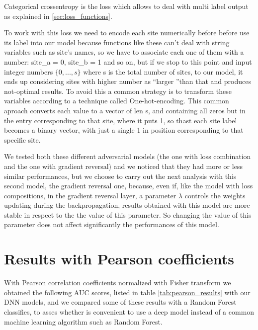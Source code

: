 \documentclass[10pt]{report}
\begin{document}
Categorical crossentropy is the loss which allows to deal with multi label output as explained in \ref{sec:loss_functions}.
\begin{notes}
\item To work with this loss we need to encode each site numerically before before use its label into our model because functions like these can't deal with string variables such as site's names, so we have to associate each one of them with a number: site\_a = 0, site\_b = 1 and so on, but if we stop to this point and input integer numbers $\{0, ..., s\}$ where s is the total number of sites, to our model, it ends up considering sites with higher number as \textquotedblleft larger \textquotedblright than that and produces not-optimal results.
To avoid this a common strategy is to transform these variables according to a technique called One-hot-encoding.
This common aproach converts each value to a vector of len s, and containing all zeros but in the entry corresponding to that site, where it puts 1, so thast each site label becomes a binary vector, with just a single 1 in position corresponding to that specific site.
\end{notes}

We tested both these different adversarial models (the one with loss combination and the one with gradient reversal) and we noticed that they had more or less similar performances, but we choose to carry out the next analysis with this second model, the gradient reversal one, because, even if, like the model with loss compositions, in the gradient reversal layer, a parameter $\lambda$ controls the weights updating during the backpropagation,
results obtained with this model are more stable in respect to the the value of this parameter.
So changing the value of this parameter does not affect significantly the performances of this model.

\newpage


\newpage
\section{Results with Pearson coefficients}

With Pearson correlation coefficients normalized with Fisher transform we obtained the following AUC scores, listed in table \ref{tab:pearson_results} with our DNN models, and we compared some of these results with a Random Forest classifies, to asses whether is convenient to use a deep model instead of a common machine learning algorithm such as Random Forest.
\end{document}
